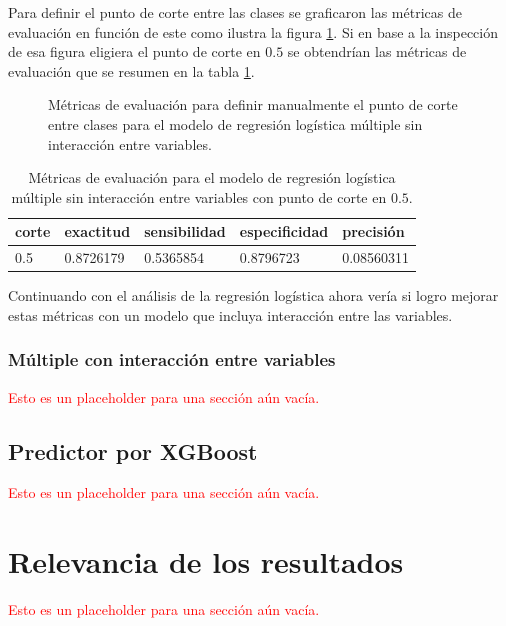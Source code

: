 \documentclass[a4paper]{report}
\begin{document}
Para definir el punto de corte entre las clases se graficaron las métricas de evaluación en función de este como ilustra la figura \ref{fig:múltiple_metrics}.
Si en base a la inspección de esa figura eligiera el punto de corte en \(0.5\) se obtendrían las métricas de evaluación que se resumen en la tabla \ref{tab:múltiple_metrics}.

\begin{figure}[!ht]
	\centering
	
	\caption{Métricas de evaluación para definir manualmente el punto de corte entre clases para el modelo de regresión logística múltiple sin interacción entre variables.}
	\label{fig:múltiple_metrics}
\end{figure}

\begin{table}[!ht]
\centering
\begin{tabular}{lllll}
\toprule
corte & exactitud & sensibilidad & especificidad & precisión \\
\midrule
\num{0.5} & \num{0.8726179} & \num{0.5365854} & \num{0.8796723} & \num{0.08560311} \\
\bottomrule
\end{tabular}
\caption{Métricas de evaluación para el modelo de regresión logística múltiple sin interacción entre variables con punto de corte en \(0.5\).}
\label{tab:múltiple_metrics}
\end{table}


Continuando con el análisis de la regresión logística ahora vería si logro mejorar estas métricas con un modelo que incluya interacción entre las variables.

\subsubsection{Múltiple con interacción entre variables}
\textcolor{red}{Esto es un placeholder para una sección aún vacía.}


\subsection{Predictor por XGBoost}
\textcolor{red}{Esto es un placeholder para una sección aún vacía.}



\section{Relevancia de los resultados}
\textcolor{red}{Esto es un placeholder para una sección aún vacía.}
\end{document}
